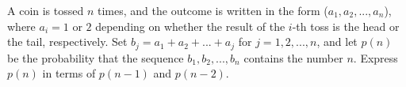 A coin is tossed $n$ times, and the outcome is written in the form ($a_1,a_2,...,a_n$), where $a_i = 1$ or $2$ depending on whether the result of the $i$-th toss is the head or the tail, respectively. Set $b_j = a_1 +a_2 +...+a_j$ for $j = 1,2,...,n$, and let $p(n)$ be the probability that the sequence $b_1,b_2,...,b_n$ contains the number $n$. Express $p(n)$ in terms of $p(n-1)$ and $p(n-2)$.